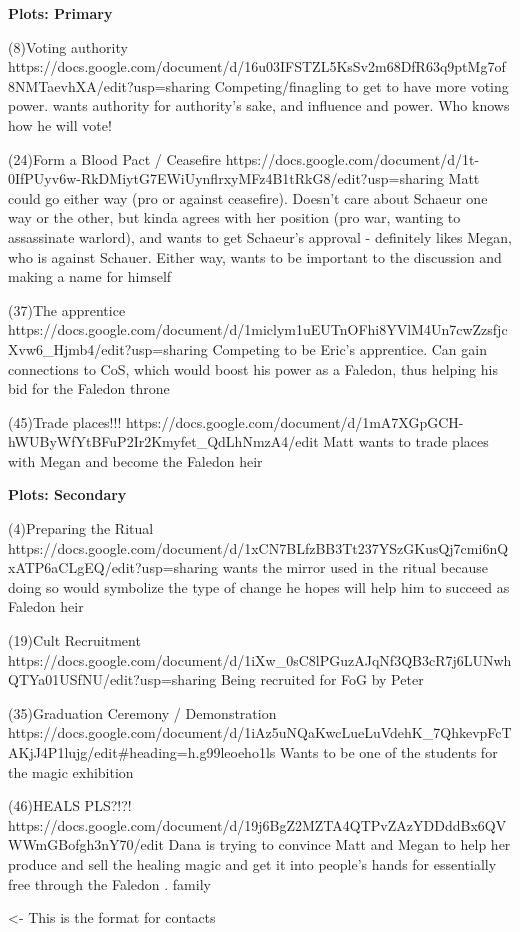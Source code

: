 \documentclass[char]{GL2020}
\begin{document}
\textbf{Plots: Primary}

(8)Voting authority
https://docs.google.com/document/d/16u03IFSTZL5KsSv2m68DfR63q9ptMg7of8NMTaevhXA/edit?usp=sharing
Competing/finagling to get to have more voting power.  \cAmbition{} wants authority for authority’s sake, and influence and power.  Who knows how he will vote!

(24)Form a Blood Pact / Ceasefire
https://docs.google.com/document/d/1t-0IfPUyv6w-RkDMiytG7EWiUynflrxyMFz4B1tRkG8/edit?usp=sharing
Matt \cAmbition{} could go either way (pro or against ceasefire). Doesn’t care about Schaeur one way or the other, but kinda agrees with her position (pro war, wanting to assassinate warlord), and wants to get Schaeur’s approval - definitely likes Megan, who is against Schauer. Either way, wants to be important to the discussion and making a name for himself

(37)The apprentice
https://docs.google.com/document/d/1miclym1uEUTnOFhi8YVlM4Un7cwZzsfjcXvw6_Hjmb4/edit?usp=sharing
Competing to be Eric's apprentice.  Can gain connections to CoS, which would boost his power as a Faledon, thus helping his bid for the Faledon throne

(45)Trade places!!!
https://docs.google.com/document/d/1mA7XGpGCH-hWUByWfYtBFuP2Ir2Kmyfet_QdLhNmzA4/edit
Matt wants to trade places with Megan and become the Faledon heir


\textbf{Plots: Secondary}

(4)Preparing the Ritual
https://docs.google.com/document/d/1xCN7BLfzBB3Tt237YSzGKusQj7cmi6nQxATP6aCLgEQ/edit?usp=sharing
\cAmbition{} wants the mirror used in the ritual because doing so would symbolize the type of change he hopes will help him to succeed as Faledon heir

(19)Cult Recruitment
https://docs.google.com/document/d/1iXw_0sC8lPGuzAJqNf3QB3cR7j6LUNwhQTYa01USfNU/edit?usp=sharing
Being recruited for FoG by Peter

(35)Graduation Ceremony / Demonstration
https://docs.google.com/document/d/1iAz5uNQaKwcLueLuVdehK_7QhkevpFcTAKjJ4P1lujg/edit#heading=h.g99leoeho1ls
Wants to be one of the students for the magic exhibition

(46)HEALS PLS?!?!
https://docs.google.com/document/d/19j6BgZ2MZTA4QTPvZAzYDDddBx6QVWWmGBofgh3nY70/edit
Dana is trying to convince Matt and Megan to help her produce and sell the healing magic and get it into people's hands for essentially free through the Faledon .  family

\begin{itemz}[Goals]
	\item 
\end{itemz}

\begin{itemz}[Notes]
	\item 
\end{itemz}

\begin{contacts}
	\contact{\cTest{}} <- This is the format for contacts 
\end{contacts}
\end{document}
